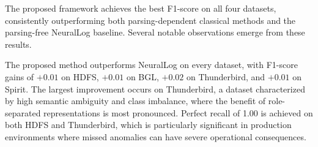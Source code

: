 \begin{table}[t]
\centering
\caption{Anomaly Detection Performance Comparison Across Benchmark Datasets}
\label{tab:results}
\end{table}

The proposed framework achieves the best F1-score on all four datasets, consistently outperforming both parsing-dependent classical methods and the parsing-free NeuralLog baseline. Several notable observations emerge from these results.

The proposed method outperforms NeuralLog on every dataset, with F1-score gains of $+0.01$ on HDFS, $+0.01$ on BGL, $+0.02$ on Thunderbird, and $+0.01$ on Spirit. The largest improvement occurs on Thunderbird, a dataset characterized by high semantic ambiguity and class imbalance, where the benefit of role-separated representations is most pronounced. Perfect recall of 1.00 is achieved on both HDFS and Thunderbird, which is particularly significant in production environments where missed anomalies can have severe operational consequences.

